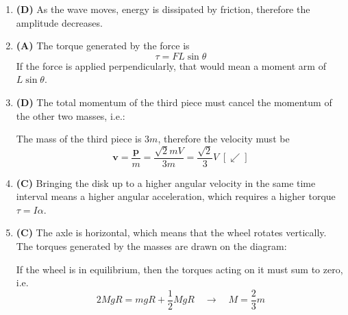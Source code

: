 \documentclass{../../oss-handout}
\begin{document}
\begin{enumerate}[leftmargin=17pt]
\item\textbf{(D)} As the wave moves, energy is dissipated by friction, therefore
  the amplitude decreases.

\item\textbf{(A)} The torque generated by the force is
  \begin{displaymath}
    \tau=FL\sin\theta
  \end{displaymath}
  If the force is applied perpendicularly, that would mean a moment arm of
  $\boxed{L\sin\theta}$.

\item\textbf{(D)} The total momentum of the third piece must cancel the momentum
  of the other two masses, i.e.:
  \begin{center}
  \end{center}
  The mass of the third piece is $3m$, therefore the velocity must be
  \begin{equation*}
    \bm{v}=\frac{\bm{p}}m
    =\frac{\sqrt2mV}{3m}=\boxed{\frac{\sqrt2}3V\;[\swarrow]}
  \end{equation*}
\item\textbf{(C)} Bringing the disk up to a higher angular velocity in the same
  time interval means a higher angular acceleration, which requires a higher
  torque $\tau=I\alpha$.
  \newpage
  
\item\textbf{(C)} The axle is horizontal, which means that the wheel rotates
  vertically. The torques generated by the masses are drawn on the diagram:
  \begin{center}
  \end{center}
  If the wheel is in equilibrium, then the torques acting on it must sum to
  zero, i.e.
  \begin{displaymath}
    2MgR=mgR+\frac12MgR \quad\longrightarrow\quad\boxed{M=\frac23m}
  \end{displaymath}


\end{enumerate}
\end{document}
